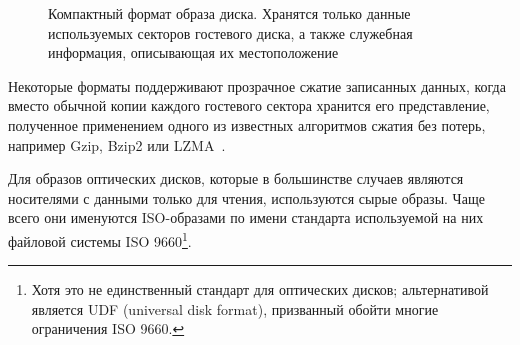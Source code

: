 \begin{figure}[htb]
    \centering
    \caption[Компактный формат образа диска]{Компактный формат образа диска. Хранятся только данные используемых секторов гостевого диска, а также служебная информация, описывающая их местоположение}
    \label{fig:compat}
\end{figure}

Некоторые форматы поддерживают прозрачное сжатие записанных данных, когда вместо обычной копии каждого гостевого сектора хранится его представление, полученное применением одного из известных алгоритмов сжатия без потерь, например Gzip, Bzip2 или LZMA~\cite{sayood2002lossless}.

Для образов оптических дисков, которые в большинстве  случаев являются носителями с данными только для чтения, используются сырые образы. Чаще всего они именуются ISO-образами по имени стандарта используемой на них файловой системы ISO 9660\footnote{Хотя это не единственный стандарт для оптических дисков; альтернативой является UDF (universal disk format), призванный обойти многие ограничения ISO 9660.}.

